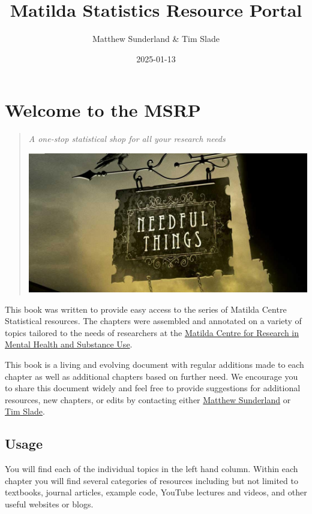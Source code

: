 \documentclass[
]{book}
\title{Matilda Statistics Resource Portal}
\author{Matthew Sunderland \& Tim Slade}
\date{2025-01-13}
\begin{document}
\maketitle

{
\setcounter{tocdepth}{1}
\tableofcontents
}
\chapter{Welcome to the MSRP}\label{welcome-to-the-msrp}

\begin{quote}
\emph{A one-stop statistical shop for all your research needs}

\includegraphics[width=1\linewidth,height=\textheight,keepaspectratio]{needfulthings.jpg}
\end{quote}

This book was written to provide easy access to the series of Matilda Centre Statistical resources. The chapters were assembled and annotated on a variety of topics tailored to the needs of researchers at the \href{https://www.sydney.edu.au/matilda-centre/}{Matilda Centre for Research in Mental Health and Substance Use}.

This book is a living and evolving document with regular additions made to each chapter as well as additional chapters based on further need. We encourage you to share this document widely and feel free to provide suggestions for additional resources, new chapters, or edits by contacting either \href{mailto:\%20matthew.sunderland@sydney.edu.au}{Matthew Sunderland} or \href{mailto:\%20tim.slade@sydney.edu.au}{Tim Slade}.

\section{Usage}\label{usage}

You will find each of the individual topics in the left hand column. Within each chapter you will find several categories of resources including but not limited to textbooks, journal articles, example code, YouTube lectures and videos, and other useful websites or blogs.
\end{document}
